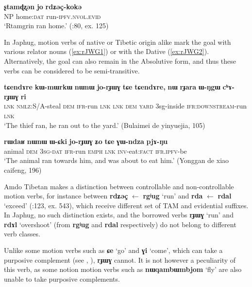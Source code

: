 \documentclass[oneside,a4paper,11pt]{article}
\newcommand{\ipa}[1]{{\phon\textbf{\mbox{#1}}}} %
\begin{document}
\begin{exe}
\ex \label{ex:rgyug}
\gll
\ipa{ʂtamɖʐən} 	\ipa{jo} \ipa{rdʑəç-kokə} 	 \\
NP home:\textsc{dat} run-\textsc{ipfv.nvol.evid} \\
\glt `Rtamgrin ran home.' (\citealt{haller04themchen}:80, ex. 125)
\end{exe}

In Japhug, motion verbs of native or Tibetic origin alike mark the goal with various relator nouns (\ref{ex:rJWG1}) or with the Dative (\ref{ex:rJWG2}). Alternatively, the goal can also remain in the Absolutive form, and thus these verbs can be considered to be semi-transitive. 

\begin{exe}
\ex \label{ex:rJWG1}
\gll
\ipa{tɕendɤre}  	\ipa{kɯ-mɯrkɯ}  	\ipa{nɯnɯ}  	\ipa{jo-rɟɯɣ}  	\ipa{tɕe}  	\ipa{tɕendɤre,}  	\ipa{nɯ}  	\ipa{rɟara}  	\ipa{ɯ-ŋgɯ}  	\ipa{cʰɤ-rɟɯɣ}  	\ipa{ri}  \\
\textsc{lnk} \textsc{nmlz}:S/A-steal \textsc{dem} \textsc{ifr}-run \textsc{lnk} \textsc{lnk} \textsc{dem} \textsc{yard} 3sg-inside \textsc{ifr:downstream}-run \textsc{lnk} \\
\glt `The thief ran, he ran out to the yard.' (Bulaimei de yinyuejia, 105)
\end{exe}

\begin{exe}
\ex \label{ex:rJWG2}
\gll
\ipa{rɯdaʁ}  	\ipa{nɯnɯ}  	\ipa{ɯ-ɕki}  	\ipa{jo-rɟɯɣ}  	\ipa{ʑo}  	\ipa{tɕe}  	\ipa{ɣɯ-ndza}  	\ipa{pjɤ-ŋu}  \\
animal \textsc{dem} \textsc{3sg-dat} \textsc{ifr}-run \textsc{emph} \textsc{lnk} \textsc{inv}-eat:\textsc{fact} \textsc{ifr.ipfv}-be \\
\glt `The animal ran towards him, and was about to eat him.' (Yonggan de xiao caifeng, 196)
\end{exe}


Amdo Tibetan makes a distinction between controllable and non-controllable motion verbs, for instance between \ipa{rdʑəç} $\leftarrow$ \ipa{rgʲug} `run' and \ipa{rda} $\leftarrow$ \ipa{rdal} `exceed' (\citealt{haller04themchen}:123, ex. 543), which receive different set of TAM and evidential suffixes. In Japhug, no such distinction exists, and  the borrowed verbs \ipa{rɟɯɣ} `run' and \ipa{rdɤl} `overshoot' (from \ipa{rgʲug} and \ipa{rdal} respectively) do not belong to different verb classes.


Unlike some motion verbs such as \ipa{ɕe} `go' and \ipa{ɣi} `come', which can take a purposive complement (see \citealt{sun12complementation}, \citealt{jacques13harmonization}), \ipa{rɟɯɣ} cannot. It is not however a peculiarity of this verb, as some notion motion verbs such as \ipa{nɯqambɯmbjom} `fly' are also unable to take purposive complements.
\end{document}

